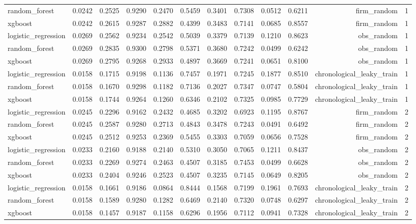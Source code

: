 \begin{table}[htbp]
\begin{tabular}{lrrrrrrrrrrr}
random\_forest & 0.0242 & 0.2525 & 0.9290 & 0.2470 & 0.5459 & 0.3401 & 0.7308 & 0.0512 & 0.6211 & firm\_random & 1 \\
xgboost & 0.0242 & 0.2615 & 0.9287 & 0.2882 & 0.4399 & 0.3483 & 0.7141 & 0.0685 & 0.8557 & firm\_random & 1 \\
logistic\_regression & 0.0269 & 0.2562 & 0.9234 & 0.2542 & 0.5039 & 0.3379 & 0.7139 & 0.1210 & 0.8623 & obs\_random & 1 \\
random\_forest & 0.0269 & 0.2835 & 0.9300 & 0.2798 & 0.5371 & 0.3680 & 0.7242 & 0.0499 & 0.6242 & obs\_random & 1 \\
xgboost & 0.0269 & 0.2795 & 0.9268 & 0.2933 & 0.4897 & 0.3669 & 0.7241 & 0.0651 & 0.8100 & obs\_random & 1 \\
logistic\_regression & 0.0158 & 0.1715 & 0.9198 & 0.1136 & 0.7457 & 0.1971 & 0.7245 & 0.1877 & 0.8510 & chronological\_leaky\_train & 1 \\
random\_forest & 0.0158 & 0.1670 & 0.9298 & 0.1182 & 0.7136 & 0.2027 & 0.7347 & 0.0747 & 0.5804 & chronological\_leaky\_train & 1 \\
xgboost & 0.0158 & 0.1744 & 0.9264 & 0.1260 & 0.6346 & 0.2102 & 0.7325 & 0.0985 & 0.7729 & chronological\_leaky\_train & 1 \\
logistic\_regression & 0.0245 & 0.2296 & 0.9162 & 0.2432 & 0.4685 & 0.3202 & 0.6923 & 0.1195 & 0.8767 & firm\_random & 2 \\
random\_forest & 0.0245 & 0.2587 & 0.9280 & 0.2713 & 0.4843 & 0.3478 & 0.7243 & 0.0491 & 0.6492 & firm\_random & 2 \\
xgboost & 0.0245 & 0.2512 & 0.9253 & 0.2369 & 0.5455 & 0.3303 & 0.7059 & 0.0656 & 0.7528 & firm\_random & 2 \\
logistic\_regression & 0.0233 & 0.2160 & 0.9188 & 0.2140 & 0.5310 & 0.3050 & 0.7065 & 0.1211 & 0.8437 & obs\_random & 2 \\
random\_forest & 0.0233 & 0.2269 & 0.9274 & 0.2463 & 0.4507 & 0.3185 & 0.7453 & 0.0499 & 0.6628 & obs\_random & 2 \\
xgboost & 0.0233 & 0.2404 & 0.9246 & 0.2523 & 0.4507 & 0.3235 & 0.7145 & 0.0649 & 0.8205 & obs\_random & 2 \\
logistic\_regression & 0.0158 & 0.1661 & 0.9186 & 0.0864 & 0.8444 & 0.1568 & 0.7199 & 0.1961 & 0.7693 & chronological\_leaky\_train & 2 \\
random\_forest & 0.0158 & 0.1589 & 0.9280 & 0.1282 & 0.6469 & 0.2140 & 0.7320 & 0.0748 & 0.6297 & chronological\_leaky\_train & 2 \\
xgboost & 0.0158 & 0.1457 & 0.9187 & 0.1158 & 0.6296 & 0.1956 & 0.7112 & 0.0941 & 0.7328 & chronological\_leaky\_train & 2 \\

\end{tabular}
\end{table}
